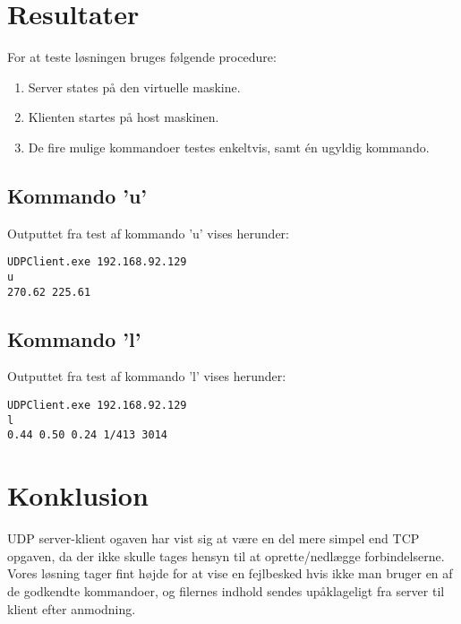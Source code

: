 \section{Resultater}
For at teste løsningen bruges følgende procedure:
\begin{enumerate}
    \item Server states på den virtuelle maskine.
    \item Klienten startes på host maskinen.
    \item De fire mulige kommandoer testes enkeltvis, samt én ugyldig kommando.
\end{enumerate}

\subsection{Kommando 'u'}
Outputtet fra test af kommando 'u' vises herunder:
\begin{lstlisting}[caption=Konsol output fra windows klient]
UDPClient.exe 192.168.92.129
u
270.62 225.61
\end{lstlisting}

\subsection{Kommando 'l'}
Outputtet fra test af kommando 'l' vises herunder:
\begin{lstlisting}[caption=Konsol output fra windows klient]
UDPClient.exe 192.168.92.129
l
0.44 0.50 0.24 1/413 3014
\end{lstlisting}

\section{Konklusion}
UDP server-klient ogaven har vist sig at være en del mere simpel end TCP opgaven, da der ikke skulle tages hensyn til at oprette/nedlægge forbindelserne. Vores løsning tager fint højde for at vise en fejlbesked hvis ikke man bruger en af de godkendte kommandoer, og filernes indhold sendes upåklageligt fra server til klient efter anmodning.